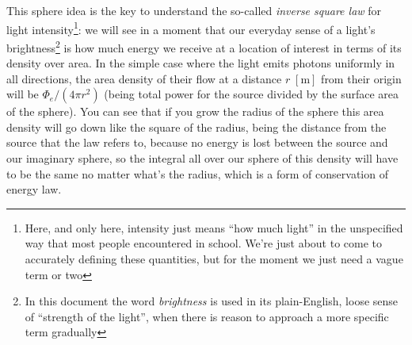 This sphere idea is the key to understand the so-called \textsl{inverse square law}
for light intensity\footnote{Here, and only here, intensity just means ``how much light'' in the
	unspecified way that most people encountered in school. We're just about to come to accurately
	defining these quantities, but for the moment we just need a vague term or two}: 
we will see in a moment that our everyday sense of a light's 
\gls{brightness}\footnote{
	In this document the word \emph{brightness} is used in its plain-English, loose sense
	of ``strength of the light'', when there is reason to approach a more specific term
	gradually}
is how much energy we receive at a location of interest in terms of its density over area.
In the simple case where the light emits photons uniformly in all directions, the area density
of their flow at a distance $r\;[\unit\meter]$ from their origin will be $\Phi_e / (4\pi r^2)$ 
(being total power for the source divided by the surface area of the sphere). 
You can see that if you grow the radius of the sphere this area density will go down 
like the square of the radius, being the distance from the source that the law refers to, 
because no energy is lost between the source and our imaginary sphere, so the integral all over
our sphere of this density will have to be the same no matter what's the radius,
which is a form of conservation of energy law.

